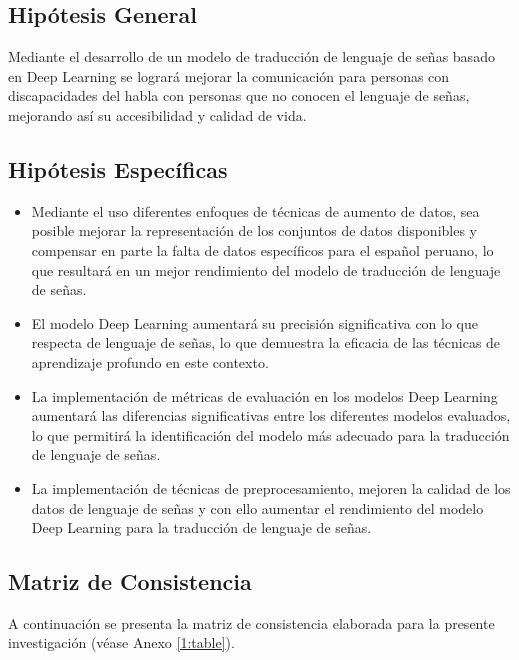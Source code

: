 \subsection{Hipótesis General}
\newcommand{\HipotesisGeneral}{
Mediante el desarrollo de un modelo de traducción de lenguaje de señas basado en Deep Learning se logrará mejorar la comunicación para personas con discapacidades del habla con personas que no conocen el lenguaje de señas, mejorando así su accesibilidad y calidad de vida.
}
\HipotesisGeneral
\subsection{Hipótesis Específicas}
\newcommand{\Hone}{
	Mediante el uso diferentes enfoques de técnicas de aumento de datos, sea posible mejorar la representación de los conjuntos de datos disponibles y compensar en parte la falta de datos específicos para el español peruano, lo que resultará en un mejor rendimiento del modelo de traducción de lenguaje de señas.
}
\newcommand{\Htwo}{
	El modelo Deep Learning aumentará su precisión significativa con lo que respecta de lenguaje de señas, lo que demuestra la eficacia de las técnicas de aprendizaje profundo en este contexto.
}
\newcommand{\Hthree}{
	La implementación de métricas de evaluación en los modelos Deep Learning aumentará las diferencias significativas entre los diferentes modelos evaluados, lo que permitirá la identificación del modelo más adecuado para la traducción de lenguaje de señas.
}
\newcommand{\Hfour}{
	La implementación de técnicas de preprocesamiento, mejoren la calidad de los datos de lenguaje de señas y con ello aumentar el rendimiento del modelo Deep Learning para la traducción de lenguaje de señas.
}

\begin{itemize}
	\item \Hone
	\item \Htwo
	\item \Hthree
	\item \Hfour
\end{itemize}

\subsection{Matriz de Consistencia}
A continuación se presenta la matriz de consistencia elaborada para la presente investigación (véase Anexo \ref{1:table}).

